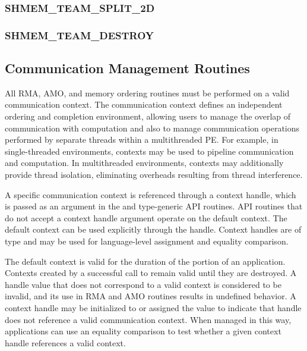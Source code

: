 \documentclass[10pt]{book}
\begin{document}
\subsubsection{\textbf{SHMEM\_TEAM\_SPLIT\_2D}}\label{subsec:shmem_team_split_2d}


\subsubsection{\textbf{SHMEM\_TEAM\_DESTROY}}\label{subsec:shmem_team_destroy}




\subsection{Communication Management Routines}
\label{sec:ctx}
All \openshmem \ac{RMA}, \ac{AMO}, and memory ordering routines must be
performed on a valid communication context.  The communication context defines an
independent ordering and completion environment, allowing users to manage the
overlap of communication with computation and also to manage communication
operations performed by separate threads within a multithreaded \ac{PE}.  For
example, in single-threaded environments, contexts may be used to pipeline
communication and computation.  In multithreaded environments, contexts may
additionally provide thread isolation, eliminating overheads resulting from
thread interference.

A specific communication context is referenced through a context handle, which is
passed as an argument in the \Cstd {} and type-generic \ac{API}
routines.  \ac{API} routines that do not accept a context handle argument operate on the
default context.  The default context can be used explicitly through the
 handle.
Context handles are of type  and may be used for
language-level assignment and equality comparison.

The default context is valid for the duration of the \openshmem portion of
an application.
Contexts created by a successful call to  remain
valid until they are destroyed.
A handle value that does not correspond to a valid context is considered
to be invalid, and its use in \ac{RMA} and \ac{AMO} routines results in
undefined behavior.
A context handle may be initialized to or assigned the value
 to indicate that handle does not reference a
valid communication context.
When managed in this way, applications can use an equality comparison
to test whether a given context handle references a valid context.
\end{document}
